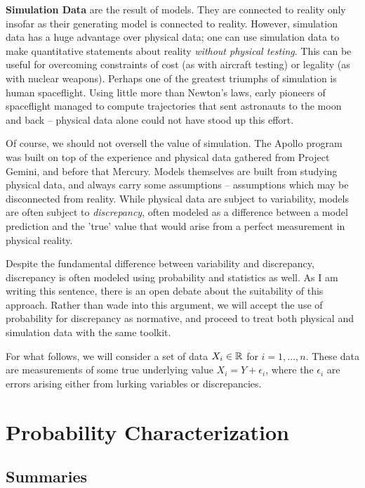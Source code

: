 \documentclass[../primer.tex]{subfiles}
\begin{document}
\textbf{Simulation Data} are the result of models. They are connected to reality
only insofar as their generating model is connected to reality. However,
simulation data has a huge advantage over physical data; one can use simulation
data to make quantitative statements about reality \emph{without physical
  testing}. This can be useful for overcoming constraints of cost (as with
aircraft testing) or legality (as with nuclear weapons). Perhaps one of the
greatest triumphs of simulation is human spaceflight. Using little more than
Newton's laws, early pioneers of spaceflight managed to compute trajectories
that sent astronauts to the moon and back -- physical data alone could not have
stood up this effort.

Of course, we should not oversell the value of simulation. The Apollo program
was built on top of the experience and physical data gathered from Project
Gemini, and before that Mercury. Models themselves are built from studying
physical data, and always carry some assumptions -- assumptions which may be
disconnected from reality. While physical data are subject to variability,
models are often subject to \emph{discrepancy}, often modeled as a difference
between a model prediction and the 'true' value that would arise from a perfect
measurement in physical reality.\cite{higdon2004calibration-prediction}

Despite the fundamental difference between variability and discrepancy,
discrepancy is often modeled using probability and statistics as
well.\cite{kennedy2001bayesian,higdon2004calibration-prediction} As I am writing
this sentence, there is an open debate about the suitability of this approach.
Rather than wade into this argument, we will accept the use of probability for
discrepancy as normative, and proceed to treat both physical and simulation data
with the same toolkit.

For what follows, we will consider a set of data $X_i\in\mathbb{R}^{}$ for $i =
1,\dots,n$. These data are measurements of some true underlying value $X_i = Y +
\epsilon_i$, where the $\epsilon_i$ are errors arising either from lurking
variables or discrepancies.

\section{Probability Characterization}

\subsection{Summaries}
\end{document}
